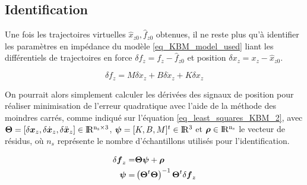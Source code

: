 %

\subsection{Identification} \label{chap3_sec_method_sub_ident}

Une fois les trajectoires virtuelles $\hat{x}_{z0}, \hat{f}_{z0}$ obtenues, il ne reste plus qu'à identifier les paramètres en impédance du modèle \cref{eq_KBM_model_used} liant les différentiels de trajectoires en force $\delta f_z = f_z - \hat{f}_{z0}$ et position $\delta x_z = x_z - \hat{x}_{z0}$. 

\begin{equation}\label{eq_KBM_model_used}
\delta f_z = M \delta \ddot{x}_z + B \delta \dot{x}_z + K \delta x_z
\end{equation}

On pourrait alors simplement calculer les dérivées des signaux de position pour réaliser minimisation de l'erreur quadratique avec l'aide de la méthode des moindres carrés, comme indiqué sur l'équation \cref{eq_least_squares_KBM_2}, avec $\matr{\Theta} = \left[\delta\vect{x}_z, \delta\dot{\vect{x}}_z, \delta\ddot{\vect{x}}_z \right] \in \Re^{n_s\times 3} $,  $\vect{\psi} = [K,B,M]^t \in \Re^3$ et $\vect{\rho} \in \Re^{n_s}$ le vecteur de résidus, où $n_s$ représente le nombre d'échantillons utilisés pour l'identification.

\begin{align} 
	\delta \vect{f}_z =& \matr{\Theta} \vect{\psi} + \vect{\rho}\label{eq_least_squares_KBM}\\
	\vect{\psi} =&  \left(\matr{\Theta}^t\matr{\Theta}\right)^{-1}\matr{\Theta}^t\delta \vect{f}_z\label{eq_least_squares_KBM_2}
\end{align}

